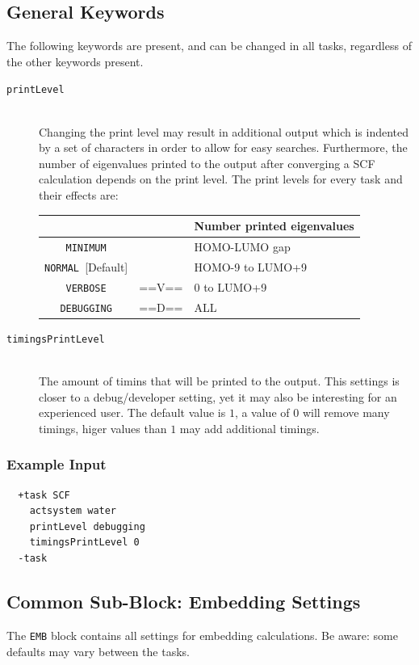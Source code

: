\documentclass[bibliography=totocnumbered,a4paper,10pt,oneside]{scrbook}
\begin{document}
\subsection{General Keywords}
\label{sec:tasksPrintLevels}
The following keywords are present, and can be changed in all tasks, regardless
of the other keywords present.
\begin{description}
  \item [\texttt{printLevel}]\hfill \\
Changing the print level may result in additional output which is indented by
a set of characters in order to allow for easy searches. Furthermore, the number
of eigenvalues printed to the output after converging a SCF calculation depends
on the print level.
The print levels for every task and their effects are:
\begin{table}[H]\small \centering \begin{tabular}{|>{\ttfamily}c|>{\ttfamily}c|l|}\hline
   & \multicolumn{1}{c|}{Indent}&\multicolumn{1}{c|}{Number printed eigenvalues}\\\hline
  \texttt{MINIMUM}          &       & HOMO-LUMO gap    \\\hline
  \texttt{NORMAL }[Default] &       & HOMO-9 to LUMO+9 \\\hline
  \texttt{VERBOSE}          & ==V== & 0 to LUMO+9      \\\hline
  \texttt{DEBUGGING}        & ==D== & ALL              \\\hline
\end{tabular}
\end{table}
\item [\texttt{timingsPrintLevel}]\hfill \\
   The amount of timins that will be printed to the output. This settings is closer to a
   debug/developer setting, yet it may also be interesting for an experienced user.
   The default value is $1$, a value of $0$ will remove many timings, higer
   values than $1$ may add additional timings.
\end{description}
\subsubsection{Example Input}
\begin{lstlisting}
  +task SCF
    actsystem water
    printLevel debugging
    timingsPrintLevel 0
  -task
\end{lstlisting}


\subsection{Common Sub-Block: Embedding Settings}
\label{sec:scb:emb}
The \texttt{EMB} block contains all settings for embedding calculations. Be aware: some defaults may vary between the tasks.
\end{document}
